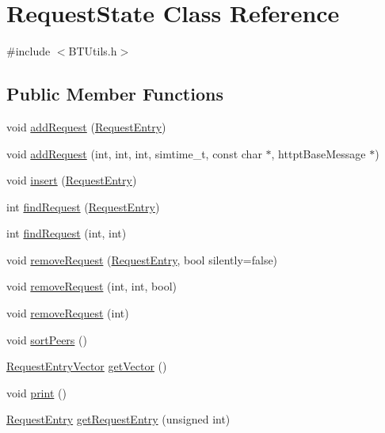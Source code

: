 \hypertarget{classRequestState}{}\section{Request\+State Class Reference}
\label{classRequestState}


{\ttfamily \#include $<$B\+T\+Utils.\+h$>$}

\subsection*{Public Member Functions}
\begin{DoxyCompactItemize}
\item 
void \hyperlink{classRequestState_aeade20f4a2271803ef166ca390c26d9c}{add\+Request} (\hyperlink{classRequestEntry}{Request\+Entry})
\item 
void \hyperlink{classRequestState_a74ad68dcafce95055dd64d3dcb690145}{add\+Request} (int, int, int, simtime\+\_\+t, const char $\ast$, httpt\+Base\+Message $\ast$)
\item 
void \hyperlink{classRequestState_a7859b0cea8ea4cb5d4ff8aca0eb79338}{insert} (\hyperlink{classRequestEntry}{Request\+Entry})
\item 
int \hyperlink{classRequestState_a3a38071b4be609a898265995a5b225a3}{find\+Request} (\hyperlink{classRequestEntry}{Request\+Entry})
\item 
int \hyperlink{classRequestState_af39d7e6daff9ba4aa8ebccbbc3dd94fe}{find\+Request} (int, int)
\item 
void \hyperlink{classRequestState_a0d9bf9e32c6bcf3e36fb4ba7d6bd0e0f}{remove\+Request} (\hyperlink{classRequestEntry}{Request\+Entry}, bool silently=false)
\item 
void \hyperlink{classRequestState_aa3f970551263497b058eab8870072561}{remove\+Request} (int, int, bool)
\item 
void \hyperlink{classRequestState_aed304f6405d49874d3be344ba5e121c6}{remove\+Request} (int)
\item 
void \hyperlink{classRequestState_a02ebfdef5b0d26e9a7e99265c96543d6}{sort\+Peers} ()
\item 
\hyperlink{BTUtils_8h_a23f79ef107bda748bd273978e5eea31a}{Request\+Entry\+Vector} \hyperlink{classRequestState_a29a5fb653ad4105df840cd66a75df2b7}{get\+Vector} ()
\item 
void \hyperlink{classRequestState_a83acebde0d4c49ac0a603b3d85b58273}{print} ()
\item 
\hyperlink{classRequestEntry}{Request\+Entry} \hyperlink{classRequestState_a72bb345bed1782d924be5d306f176709}{get\+Request\+Entry} (unsigned int)

\end{DoxyCompactItemize}
